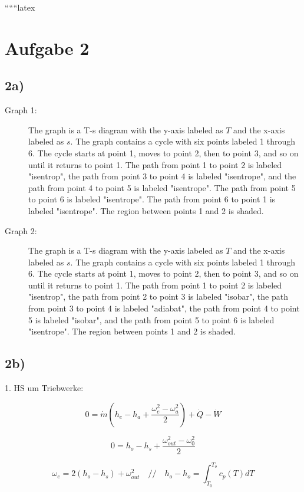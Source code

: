 
``````latex


\section*{Aufgabe 2}

\subsection*{2a)}

\begin{description}
    \item[Graph 1:] The graph is a T-s diagram with the y-axis labeled as \( T \) and the x-axis labeled as \( s \). The graph contains a cycle with six points labeled 1 through 6. The cycle starts at point 1, moves to point 2, then to point 3, and so on until it returns to point 1. The path from point 1 to point 2 is labeled "isentrop", the path from point 3 to point 4 is labeled "isentrope", and the path from point 4 to point 5 is labeled "isentrope". The path from point 5 to point 6 is labeled "isentrope". The path from point 6 to point 1 is labeled "isentrope". The region between points 1 and 2 is shaded.
    \item[Graph 2:] The graph is a T-s diagram with the y-axis labeled as \( T \) and the x-axis labeled as \( s \). The graph contains a cycle with six points labeled 1 through 6. The cycle starts at point 1, moves to point 2, then to point 3, and so on until it returns to point 1. The path from point 1 to point 2 is labeled "isentrop", the path from point 2 to point 3 is labeled "isobar", the path from point 3 to point 4 is labeled "adiabat", the path from point 4 to point 5 is labeled "isobar", and the path from point 5 to point 6 is labeled "isentrope". The region between points 1 and 2 is shaded.
\end{description}

\subsection*{2b)}

1. HS um Triebwerke:

\[
0 = \dot{m} (h_e - h_a + \frac{\omega_e^2 - \omega_a^2}{2}) + \dot{Q} - \dot{W}
\]

\[
0 = h_o - h_s + \frac{\omega_{out}^2 - \omega_0^2}{2}
\]

\[
\omega_e = 2 (h_o - h_s) + \omega_{out}^2 \quad // \quad h_o - h_o = \int_{T_0}^{T_o} c_p(T) dT
\]

